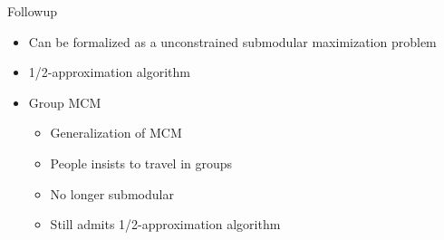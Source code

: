 \begin{frame}{Followup}
\begin{itemize}
	\item<1> Can be formalized as a unconstrained submodular maximization problem
	\item<2> 1/2-approximation algorithm
	\item<3-7> Group MCM
  	\begin{itemize}
    	\item<4> Generalization of MCM
    	\item<5> People insists to travel in groups
    	\item<6> No longer submodular
    	\item<7> Still admits 1/2-approximation algorithm 
	\end{itemize}
\end{itemize}
\end{frame}
